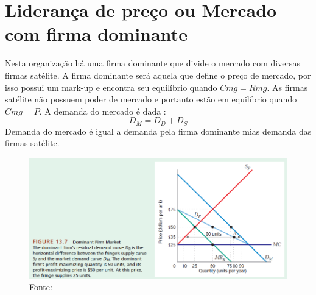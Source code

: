 \documentclass[12pt,a4paper,oneside,brazil]{abntex2}
\begin{document}
\section{Liderança de preço ou Mercado com firma dominante}
Nesta organização há uma firma dominante que divide o mercado com diversas firmas satélite. A firma dominante será aquela que define o preço de mercado, por isso possui um mark-up e encontra seu equilíbrio quando $Cmg = Rmg$. As firmas satélite não possuem poder de mercado e portanto estão em equilíbrio quando $Cmg = P$. A demanda do mercado é dada :
\[ D_M = D_D + D_S \]
Demanda do mercado é igual a demanda pela firma dominante mias demanda das firmas satélite.
\begin{figure}[h]
\centering
\includegraphics[scale=0.7]{Firma dominante.png}
\caption{Fonte: \cite[p. 546]{besanko}}
\end{figure}


\printbibliography
\end{document}
